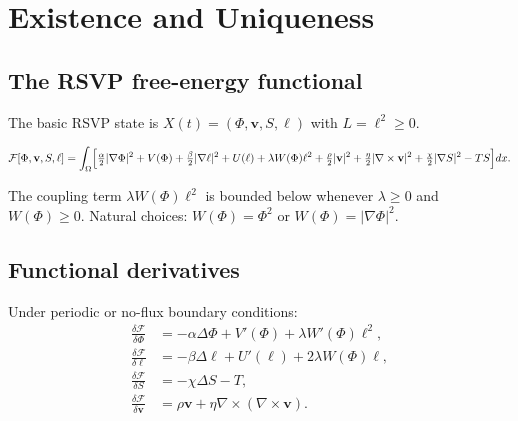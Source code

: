 
\chapter{Existence and Uniqueness}
\label{ch:existence-uniqueness}

\section{The RSVP free-energy functional}

The basic RSVP state is
$X(t) = (\Phi, \mathbf{v}, S, \ell)$ with $L = \ell^2 \geq 0$.

\begin{definition}
  \label{def:rsvp-functional}
  \[
    \mathcal{F}[\Phi,\mathbf{v},S,\ell]
    = \int_\Omega \Bigl[
      \tfrac{\alpha}{2}|\nabla\Phi|^2 + V(\Phi)
      + \tfrac{\beta}{2}|\nabla\ell|^2 + U(\ell)
      + \lambda W(\Phi)\ell^2
      + \tfrac{\rho}{2}|\mathbf{v}|^2
      + \tfrac{\eta}{2}|\nabla\times\mathbf{v}|^2
      + \tfrac{\chi}{2}|\nabla S|^2 - TS
    \Bigr]dx.
  \]
\end{definition}

The coupling term $\lambda W(\Phi)\ell^2$ is bounded below
whenever $\lambda \geq 0$ and $W(\Phi) \geq 0$.
Natural choices: $W(\Phi) = \Phi^2$ or $W(\Phi) = |\nabla\Phi|^2$.

\section{Functional derivatives}

\begin{proposition}
  \label{prop:rsvp-variations}
  \statusproven{}
  Under periodic or no-flux boundary conditions:
  \begin{align}
    \frac{\delta\mathcal{F}}{\delta\Phi}
    &= -\alpha\Delta\Phi + V'(\Phi) + \lambda W'(\Phi)\ell^2,
    \label{eq:dFdPhi}\\
    \frac{\delta\mathcal{F}}{\delta\ell}
    &= -\beta\Delta\ell + U'(\ell) + 2\lambda W(\Phi)\ell,
    \label{eq:dFdell}\\
    \frac{\delta\mathcal{F}}{\delta S}
    &= -\chi\Delta S - T,
    \label{eq:dFdS}\\
    \frac{\delta\mathcal{F}}{\delta\mathbf{v}}
    &= \rho\mathbf{v} + \eta\nabla\times(\nabla\times\mathbf{v}).
    \label{eq:dFdv}
  \end{align}
\end{proposition}

